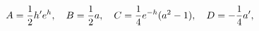 \begin{equation}
A={1\over2}h'e^h, \quad B={1\over2}a, \quad C={1\over4}e^{-h}(a^2-1), \quad D=-{1\over4}a',
\end{equation}

